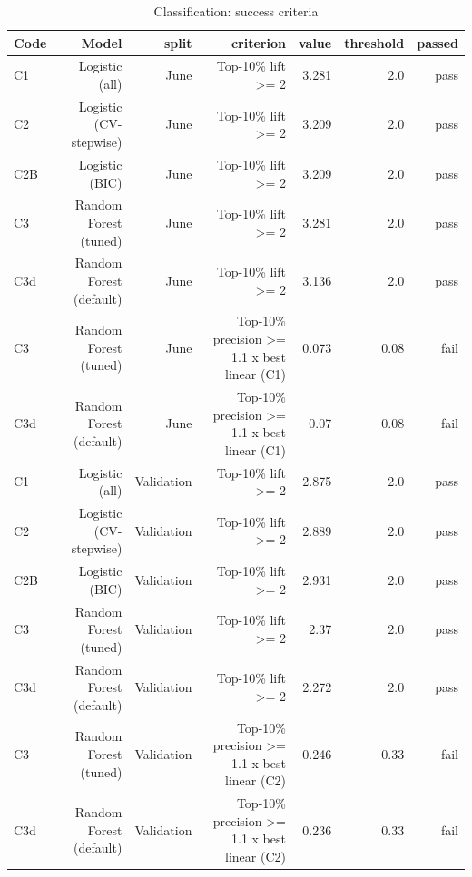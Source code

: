 \begin{table}[htbp]
\centering
\small
\caption{Classification: success criteria}
\begin{tabular}{lrrrrrr}
\toprule
Code & Model & split & criterion & value & threshold & passed \\
\midrule
C1 & Logistic (all) & June & Top-10\% lift >= 2 & 3.281 & 2.0 & pass \\
C2 & Logistic (CV-stepwise) & June & Top-10\% lift >= 2 & 3.209 & 2.0 & pass \\
C2B & Logistic (BIC) & June & Top-10\% lift >= 2 & 3.209 & 2.0 & pass \\
C3 & Random Forest (tuned) & June & Top-10\% lift >= 2 & 3.281 & 2.0 & pass \\
C3d & Random Forest (default) & June & Top-10\% lift >= 2 & 3.136 & 2.0 & pass \\
C3 & Random Forest (tuned) & June & Top-10\% precision >= 1.1 x best linear (C1) & 0.073 & 0.08 & fail \\
C3d & Random Forest (default) & June & Top-10\% precision >= 1.1 x best linear (C1) & 0.07 & 0.08 & fail \\
C1 & Logistic (all) & Validation & Top-10\% lift >= 2 & 2.875 & 2.0 & pass \\
C2 & Logistic (CV-stepwise) & Validation & Top-10\% lift >= 2 & 2.889 & 2.0 & pass \\
C2B & Logistic (BIC) & Validation & Top-10\% lift >= 2 & 2.931 & 2.0 & pass \\
C3 & Random Forest (tuned) & Validation & Top-10\% lift >= 2 & 2.37 & 2.0 & pass \\
C3d & Random Forest (default) & Validation & Top-10\% lift >= 2 & 2.272 & 2.0 & pass \\
C3 & Random Forest (tuned) & Validation & Top-10\% precision >= 1.1 x best linear (C2) & 0.246 & 0.33 & fail \\
C3d & Random Forest (default) & Validation & Top-10\% precision >= 1.1 x best linear (C2) & 0.236 & 0.33 & fail \\
\bottomrule
\end{tabular}
\par\smallskip\begin{minipage}{\linewidth}\footnotesize \end{minipage}
\end{table}

